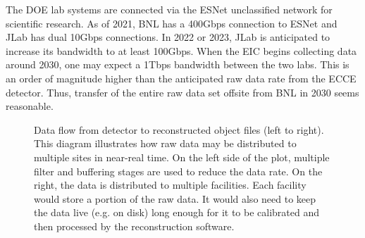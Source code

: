 The DOE lab systems are connected via the ESNet unclassified network for scientific research\cite{ESNet}. As of 2021, BNL has a 400Gbps connection to ESNet and JLab has dual 10Gbps connections. In 2022 or 2023, JLab is anticipated to increase its bandwidth to at least 100Gbps. When the EIC begins collecting data around 2030, one may expect a 1Tbps bandwidth between the two labs. This is an order of magnitude higher than the anticipated raw data rate from the ECCE detector. Thus, transfer of the entire raw data set offsite from BNL in 2030 seems reasonable.


\begin{figure}[hbt!]
 \begin{center}
  \caption[Example of federated processing of data in near real-time using multiple sites.]{\label{fig:federated_offsite_example} Data flow from detector to reconstructed object files (left to right). This diagram illustrates how raw data may be distributed to multiple sites in near-real time. On the left side of the plot, multiple filter and buffering stages are used to reduce the data rate. On the right, the data is distributed to multiple facilities.
  Each facility would store a portion of the raw data. It would also need to keep the data live (e.g. on disk) long enough for it to be calibrated and then processed by the reconstruction software.}
 \end{center}
\end{figure}

